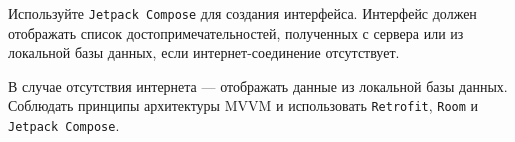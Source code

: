 
Используйте \texttt{Jetpack Compose} для создания интерфейса. Интерфейс должен отображать список достопримечательностей, полученных с сервера или из локальной базы данных, если интернет-соединение отсутствует.


В случае отсутствия интернета — отображать данные из локальной базы данных.
Соблюдать принципы архитектуры MVVM и использовать \texttt{Retrofit}, \texttt{Room} и \texttt{Jetpack Compose}.